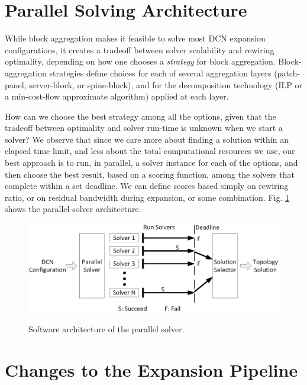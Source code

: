 \documentclass[letterpaper,twocolumn,10pt]{article}
\begin{document}
\section{Parallel Solving Architecture}\label{parallelsolversection}
While block aggregation makes it feasible to solve most DCN expansion configurations, it creates a tradeoff between solver scalability and rewiring optimality, depending on how one chooses a \emph{strategy} for block aggregation.  Block-aggregation strategies define choices for each of several aggregation layers (patch-panel, server-block, or spine-block),
and for the decomposition technology (ILP or a min-cost-flow approximate algorithm) applied at each layer.

How can we choose the best strategy among all the options, given that the tradeoff between optimality and solver run-time is unknown when we start a solver?   We observe that since we care more about finding a solution within an elapsed time limit, and less about the total computational resources we use, our best approach is to run, in parallel, a solver instance for each of the options, and then choose the best result, based on a scoring function, among the solvers that complete within a set deadline.  We can define scores based simply on rewiring ratio, or on residual bandwidth during expansion, or some combination. Fig. \ref{parallelsolver} shows the parallel-solver architecture.

\begin{figure}[ht]
  \centering
  \includegraphics[scale=0.45]{parallel_solver}\\
\vspace{-1ex}
  \caption{Software architecture of the parallel solver.}\label{parallelsolver}
\end{figure}



\section{Changes to the Expansion Pipeline}\label{expansionplannersection}
\end{document}
